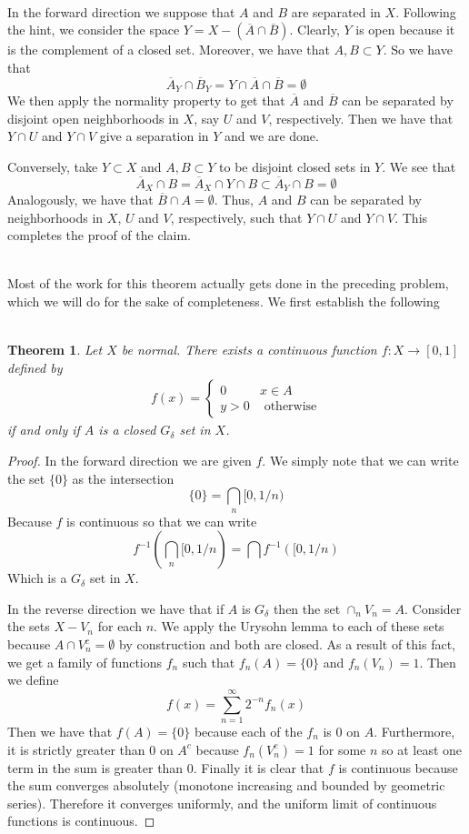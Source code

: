 \documentclass{article}
\newcommand{\problem}[1]{\noindent{\textbf{Problem #1}}\\}
\newtheorem*{thm}{\\ Theorem}
\begin{document}
\problem{4.32.6}In the forward direction we suppose that $A$ and $B$ are separated in $X$. Following the hint, we consider the space $Y = X - (\overline{A} \cap \overline{B})$. Clearly, $Y$ is open because it is the complement of a closed set. Moreover, we have that $A,B \subset Y$. So we have that
\[
\overline{A}_Y \cap \overline{B}_Y = Y \cap \overline{A} \cap \overline{B} = \emptyset
\] 
We then apply the normality property to get that $\overline{A}$ and $\overline{B}$ can be separated by disjoint open neighborhoods in $X$, say $U$ and $V$, respectively. Then we have that $Y \cap U$ and $Y\cap V$ give a separation in $Y$ and we are done. 

Conversely, take $Y \subset X$ and $A,B \subset Y$ to be disjoint closed sets in $Y$. We see that 
\[
\overline{A}_X \cap B = \overline{A}_X \cap Y \cap B \subset \overline{A}_Y \cap B = \emptyset
\]
Analogously, we have that $\overline{B} \cap A = \emptyset$. Thus, $A$ and $B$ can be separated by neighborhoods in $X$, $U$ and $V$, respectively, such that $Y \cap U$ and $Y \cap V$. This completes the proof of the claim. 

\problem{4.33.5} Most of the work for this theorem actually gets done in the preceding problem, which we will do for the sake of completeness. We first establish the following
\begin{thm}
Let $X$ be normal. There exists a continuous function $f: X \to [0,1]$ defined by
\begin{align*}
f(x) = \begin{cases}
0 & x \in A \\
y > 0 & \text{ otherwise}
\end{cases}
\end{align*}
if and only if $A$ is a closed $G_\delta$ set in $X$. 
\end{thm}
\begin{proof}
In the forward direction we are given $f$. We simply note that we can write the set $\{0\}$ as the intersection
\[
\{0\} = \bigcap_n [0,1/n)
\]
Because $f$ is continuous so that we can write 
\[
f^{-1}(\bigcap_n [0,1/n) = \bigcap f^{-1}([0,1/n)
\]
Which is a $G_\delta$ set in $X$. 

In the reverse direction we have that if $A$ is $G_\delta$ then the set $\cap_nV_n = A$. Consider the sets $X - V_n$ for each $n$. We apply the Urysohn lemma to each of these sets because $A \cap V_n^c = \emptyset$ by construction and both are closed. As a result of this fact, we get a family of functions  $f_n$ such that $f_n(A) = \{0\}$ and $f_n(V_n) = 1$. Then we define 
\[
f(x) = \sum_{n=1}^\infty 2^{-n}f_n(x)
\]
Then we have that $f(A) = \{0\}$ because each of the $f_n$ is 0 on $A$. Furthermore, it is strictly greater than $0$ on $A^c$ because $f_n(V_n^c) = 1$ for some $n$ so at least one term in the sum is greater than 0. Finally it is clear that $f$ is continuous because the sum converges absolutely (monotone increasing and bounded by geometric series). Therefore it converges uniformly, and the uniform limit of continuous functions is continuous. 
\end{proof} 
\end{document}
